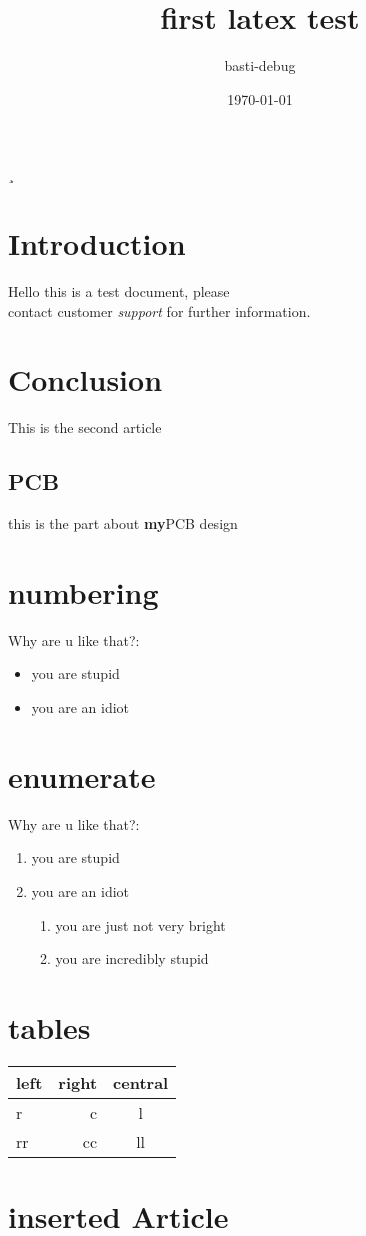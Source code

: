 \documentclass[a4paper,12pt]{scrartcl}
\title{first latex test}
\author{basti-debug}
\date{\today}
\begin{document}
	\maketitle
	\tableofcontents
¸
	\section{Introduction}
	Hello this is a test document, please \\ %
	contact customer \emph{support} for further information. 
	
	\section{Conclusion}
	This is the second article 
	\subsection{PCB}
	this is the part about \textbf{my}PCB design 
	
	\section{numbering}
	Why are u like that?:
	\begin{itemize}
		\item you are stupid
		\item you are an idiot
	\end{itemize}

	\section{enumerate}
	Why are u like that?:
	\begin{enumerate}
		\item you are stupid
		\item you are an idiot
		\begin{enumerate}
			\item you are just not very bright 
			\item you are incredibly stupid
		\end{enumerate}
	\end{enumerate}


	\section{tables}
	\begin{center}
		\begin{tabular}{|l|r|c|}
			left & right & central \\
		\hline
			r & c & l \\
			rr & cc & ll \\
		\end{tabular}
	\end{center}


	\section{inserted Article}
	
	
\end{document}
